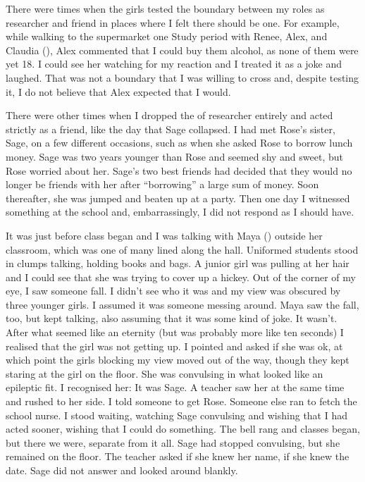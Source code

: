 There were times when the girls tested the boundary between my roles as researcher and friend in places where I felt there should be one. For example, while walking to the supermarket one Study period with Renee, Alex, and Claudia (), Alex commented that I could buy them alcohol, as none of them were yet 18. I could see her watching for my reaction and I treated it as a joke and laughed. That was not a boundary that I was willing to cross and, despite testing it, I do not believe that Alex expected that I would.



There were other times when I dropped the  of researcher entirely and acted strictly as a friend, like the day that Sage collapsed. I had met Rose's sister, Sage, on a few different occasions, such as when she asked Rose to borrow lunch money. Sage was two years younger than Rose and seemed shy and sweet, but Rose worried about her. Sage's two best friends had decided that they would no longer be friends with her after ``borrowing'' a large sum of money. Soon thereafter, she was jumped and beaten up at a party. Then one day I witnessed something at the school and, embarrassingly, I did not respond as I should have. 

It was just before class began and I was talking with Maya () outside her classroom, which was one of many lined along the hall. Uniformed students stood in clumps talking, holding books and bags. A junior girl was pulling at her hair and I could see that she was trying to cover up a hickey. Out of the corner of my eye, I saw someone fall. I didn't see who it was and my view was obscured by three younger girls. I assumed it was someone messing around. Maya saw the fall, too, but kept talking, also assuming that it was some kind of joke. It wasn't. After what seemed like an eternity (but was probably more like ten seconds) I realised that the girl was not getting up. I pointed and asked if she was ok, at which point the girls blocking my view moved out of the way, though they kept staring at the girl on the floor. She was convulsing in what looked like an epileptic fit. I recognised her: It was Sage. A teacher saw her at the same time and rushed to her side. I told someone to get Rose. Someone else ran to fetch the school nurse. I stood waiting, watching Sage convulsing and wishing that I had acted sooner, wishing that I could do something. The bell rang and classes began, but there we were, separate from it all. Sage had stopped convulsing, but she remained on the floor. The teacher asked if she knew her name, if she knew the date. Sage did not answer and looked around blankly. 

